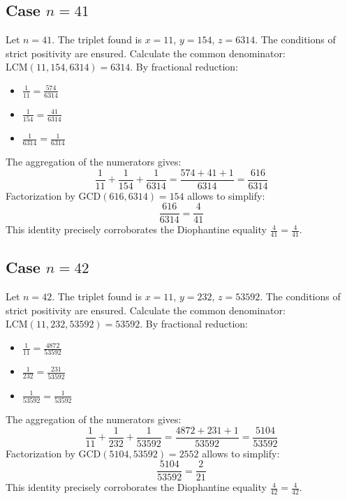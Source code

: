 \documentclass[11pt,a4paper]{article}
\begin{document}
\subsection{Case $n = 41$}
Let $n = 41$. The triplet found is $x = 11$, $y = 154$, $z = 6314$.
The conditions of strict positivity are ensured.
Calculate the common denominator: $\text{LCM}(11, 154, 6314) = 6314$.
By fractional reduction:
\begin{itemize}
    \item $\frac{1}{11} = \frac{574}{6314}$
    \item $\frac{1}{154} = \frac{41}{6314}$
    \item $\frac{1}{6314} = \frac{1}{6314}$
\end{itemize}
The aggregation of the numerators gives:
$$ \frac{1}{11} + \frac{1}{154} + \frac{1}{6314} = \frac{574 + 41 + 1}{6314} = \frac{616}{6314} $$
Factorization by $\text{GCD}(616, 6314) = 154$ allows to simplify:
$$ \frac{616}{6314} = \frac{4}{41} $$
This identity precisely corroborates the Diophantine equality $\frac{4}{41} = \frac{4}{41}$.

\subsection{Case $n = 42$}
Let $n = 42$. The triplet found is $x = 11$, $y = 232$, $z = 53592$.
The conditions of strict positivity are ensured.
Calculate the common denominator: $\text{LCM}(11, 232, 53592) = 53592$.
By fractional reduction:
\begin{itemize}
    \item $\frac{1}{11} = \frac{4872}{53592}$
    \item $\frac{1}{232} = \frac{231}{53592}$
    \item $\frac{1}{53592} = \frac{1}{53592}$
\end{itemize}
The aggregation of the numerators gives:
$$ \frac{1}{11} + \frac{1}{232} + \frac{1}{53592} = \frac{4872 + 231 + 1}{53592} = \frac{5104}{53592} $$
Factorization by $\text{GCD}(5104, 53592) = 2552$ allows to simplify:
$$ \frac{5104}{53592} = \frac{2}{21} $$
This identity precisely corroborates the Diophantine equality $\frac{4}{42} = \frac{4}{42}$.
\end{document}
